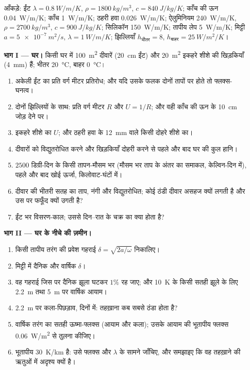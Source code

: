 \begin{problem}[{सप्ताहांत समस्या --- किसी इमारत के और किसी चिप के
पैमाने पर चालन}]\label{pb:b2:heat-conduction:1}
आँकड़े: ईंट $\lambda = \qty{0.8}{W/m/K}$, $\rho = \qty{1800}{kg/m^3}$, $c =
\qty{840}{J/kg/K}$; काँच की ऊन \qty{0.04}{W/m/K}; काँच \qty{1}{W/m/K}; ठहरी
हवा \qty{0.026}{W/m/K}; ऐलुमिनियम \qty{240}{W/m/K}, $\rho = \qty{2700}{kg/m^3}$,
$c = \qty{900}{J/kg/K}$; सिलिकॉन \qty{150}{W/m/K}; तापीय लेप
\qty{5}{W/m/K}; मिट्टी $a = \qty{5e-7}{m^2/s}$, $\lambda = \qty{1}{W/m/K}$;
झिल्लियाँ $h_{\text{भीतर}} = 8$, $h_{\text{बाहर}} = \qty{25}{W/m^2/K}$।

\textbf{भाग I --- घर।}
किसी घर में \qty{100}{m^2} दीवारें (\qty{20}{cm} ईंट) और \qty{20}{m^2}
इकहरे शीशे की खिड़कियाँ (\qty{4}{mm}) हैं; भीतर \qty{20}{\celsius},
बाहर \qty{0}{\celsius}।
\begin{enumerate}
  \item अकेली ईंट का प्रति वर्ग मीटर प्रतिरोध; और यदि उसके फलक दोनों
        तापों पर होते तो फ्लक्स-घनत्व।
  \item दोनों झिल्लियों के साथ: प्रति वर्ग मीटर $R$ और $U = 1/R$; और वही
        काँच की ऊन के \qty{10}{cm} जोड़ देने पर।
  \item इकहरे शीशे का $U$; और ठहरी हवा के \qty{12}{mm} वाले किसी दोहरे
        शीशे का।
  \item दीवारों को विद्युतरोधित करने और खिड़कियाँ दोहरी करने से पहले और बाद
        घर की कुल हानि।
  \item $2500$ डिग्री-दिन के किसी तापन-मौसम भर (मौसम भर ताप के अंतर का
        समाकल, केल्विन-दिन में),
        पहले और बाद खोई ऊर्जा, किलोवाट-घंटों में।
  \item दीवार की भीतरी सतह का ताप, नंगी और विद्युतरोधित; कोई ठंडी
        दीवार असहज क्यों लगती है और उस पर फफूँद क्यों उगती है?
  \item ईंट भर विसरण-काल; उससे दिन--रात के चक्र का क्या
        होता है?
\end{enumerate}

\textbf{भाग II --- घर के नीचे की ज़मीन।}
\begin{enumerate}[resume]
  \item किसी तापीय तरंग की प्रवेश गहराई $\delta = \sqrt{2a/\omega}$
        निकालिए।
  \item मिट्टी में दैनिक और वार्षिक $\delta$।
  \item वह गहराई जिस पर दैनिक झूला घटकर $1\%$ रह जाए; और \qty{10}{K} के
        किसी सतही झूले के लिए \qty{2.2}{m} तथा \qty{5}{m} पर वार्षिक
        आयाम।
  \item \qty{2.2}{m} पर कला-पिछड़ाव, दिनों में: तहख़ाना कब सबसे ठंडा होता है?
  \item वार्षिक तरंग का सतही ऊष्मा-फ्लक्स (आयाम और कला);
        उसके आयाम की भूतापीय फ्लक्स \qty{0.06}{W/m^2} से तुलना कीजिए।
  \item भूतापीय  \qty{30}{K/km} है: उसे फ्लक्स और $\lambda$ के सामने
        जाँचिए, और समझाइए कि वह तहख़ाने की ऋतुओं में
        अदृश्य क्यों है।
\end{enumerate}


\end{problem}
